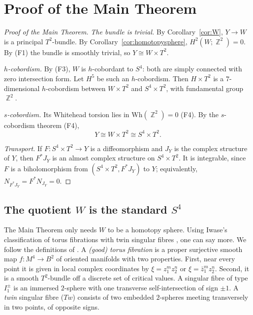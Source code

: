 \documentclass{article}
\DeclareMathOperator{\Z}{\mathbb{Z}}
\theoremstyle{definition}
\theoremstyle{plain}
\begin{document}
\section{Proof of the Main Theorem}\label{sec:proof}

\begin{proof}[Proof of the Main Theorem]
\emph{The bundle is trivial.} By Corollary~\ref{cor:W}, $Y\to W$ is a principal
$T^2$-bundle. By Corollary~\ref{cor:homotopysphere}, $H^2(W;\Z^2)=0$. By (F1) the bundle
is smoothly trivial, so $Y\cong W\times T^2$.

\emph{$h$-cobordism.} By (F3), $W$ is $h$-cobordant to $S^4$: both are simply connected
with zero intersection form. Let $H^5$ be such an $h$-cobordism. Then $H\times T^2$ is a
$7$-dimensional $h$-cobordism between $W\times T^2$ and $S^4\times T^2$, with fundamental
group $\Z^2$.

\emph{$s$-cobordism.} Its Whitehead torsion lies in $\mathrm{Wh}(\Z^2)=0$ (F4). By the
$s$-cobordism theorem (F4),
\[Y\cong W\times T^2\cong S^4\times T^2.\]

\emph{Transport.} If $F\colon S^4\times T^2\to Y$ is a diffeomorphism and $J_Y$ is the
complex structure of $Y$, then $F^*J_Y$ is an almost complex structure on
$S^4\times T^2$. It is integrable, since $F$ is a biholomorphism from
$(S^4\times T^2,F^*J_Y)$ to $Y$; equivalently, $N_{F^*J_Y}=F^*N_{J_Y}=0$.
\end{proof}

\subsection{The quotient $W$ is the standard $S^4$}
The Main Theorem only needs $W$ to be a homotopy sphere. Using Iwase's classification
of torus fibrations with twin singular fibres \cite{Iwase84}, one can say more. We
follow the definitions of \cite[\S2]{Matsumoto85}. A \emph{(good) torus fibration} is a
proper surjective smooth map $f\colon M^4\to B^2$ of oriented manifolds with two
properties. First, near every point it is given in local complex coordinates by
$\xi=z_1^mz_2^n$ or $\xi=\bar z_1^mz_2^n$. Second, it is a smooth $T^2$-bundle off a
discrete set of critical values. A singular fibre of type $I_1^\pm$ is an immersed
$2$-sphere with one transverse self-intersection of sign $\pm1$. A \emph{twin} singular
fibre ($Tw$) consists of two embedded $2$-spheres meeting transversely in two points,
of opposite signs.
\end{document}
